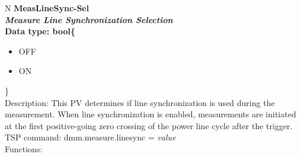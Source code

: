 \documentclass[openany]{article}
\begin{document}
		\begin{tabular}{N}
			\hline
			\bfseries MeasLineSync-Sel\label{pv:measlinesync-sel} \\ \hline
			\emph{Measure Line Synchronization Selection} \\
			Data type: bool\{\begin{itemize}[noitemsep]
				\small
				\item[] OFF
				\item[] ON
			\end{itemize}\} \\
			Description: This PV determines if line synchronization is used during the measurement. When line synchronization is enabled, measurements are initiated at the first positive-going zero crossing of the power line cycle after the trigger. \\
			TSP command: dmm.measure.linesync = \emph{value} \\
			Functions: \\
			\arrayrulecolor{\FuncTableBorderColor}

		\end{tabular}
\end{document}
